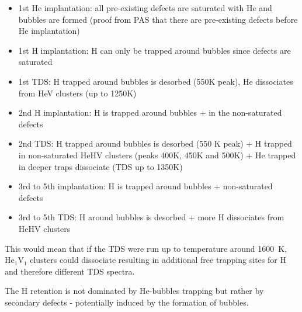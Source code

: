 \begin{itemize}
    \item 1st He implantation: all pre-existing defects are saturated with He and bubbles are formed (proof from PAS that there are pre-existing defects before He implantation)
    \item 1st H implantation: H can only be trapped around bubbles since defects are saturated
    \item 1st TDS: H trapped around bubbles is desorbed (550K peak), He dissociates from HeV clusters (up to 1250K)
    \item 2nd H implantation: H is trapped around bubbles + in the non-saturated defects
    \item 2nd TDS: H trapped around bubbles is desorbed (550 K peak) + H trapped in non-saturated HeHV clusters (peaks 400K, 450K and 500K) + He trapped in deeper traps dissociate (TDS up to 1350K)
    
    \item 3rd to 5th implantation: H is trapped around bubbles + non-saturated defects
    \item 3rd to 5th TDS: H around bubbles is desorbed + more H dissociates from HeHV clusters
\end{itemize}





This would mean that if the TDS were run up to temperature around \SI{1600}{K}, $\mathrm{He}_1\mathrm{V}_1$ clusters could dissociate resulting in additional free trapping sites for H and therefore different TDS spectra.

The H retention is not dominated by He-bubbles trapping but rather by secondary defects - potentially induced by the formation of bubbles.



